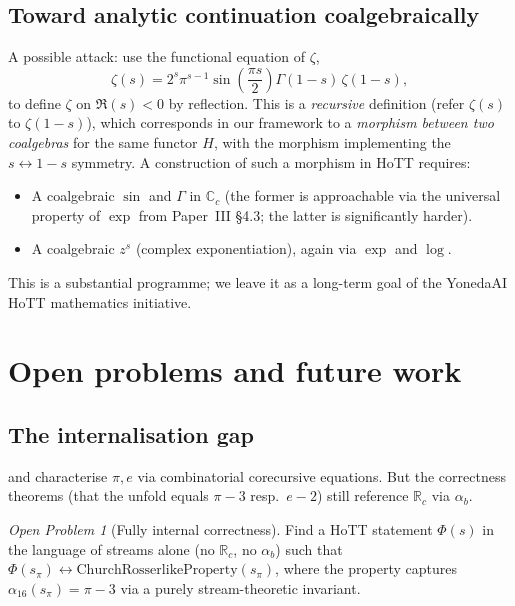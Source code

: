 \documentclass[12pt]{article}
\theoremstyle{definition}
\theoremstyle{remark}
\newtheorem{problem}[theorem]{Open Problem}
\newcommand{\R}{\mathbb{R}}
\newcommand{\Rc}{\R_c}
\begin{document}
\subsection{Toward analytic continuation coalgebraically}

A possible attack: use the functional equation of $\zeta$,
\[
\zeta(s) = 2^s \pi^{s-1} \sin\!\left(\frac{\pi s}{2}\right)
\Gamma(1-s)\,\zeta(1-s),
\]
to define $\zeta$ on $\Re(s) < 0$ by reflection. This is a
\emph{recursive} definition (refer $\zeta(s)$ to $\zeta(1-s)$),
which corresponds in our framework to a \emph{morphism between
two coalgebras} for the same functor $H$, with the morphism
implementing the $s \leftrightarrow 1-s$ symmetry. A
construction of such a morphism in HoTT requires:

\begin{itemize}
\item A coalgebraic $\sin$ and $\Gamma$ in $\mathbb{C}_c$ (the
former is approachable via the universal property of $\exp$ from
Paper~III \S 4.3; the latter is significantly harder).
\item A coalgebraic $z^s$ (complex exponentiation), again via
$\exp$ and $\log$.
\end{itemize}

This is a substantial programme; we leave it as a long-term goal
of the YonedaAI HoTT mathematics initiative.

\section{Open problems and future work}\label{sec:open}

\subsection{The internalisation gap}

 and  characterise
$\pi, e$ via combinatorial corecursive equations. But the
correctness theorems (that the unfold equals $\pi - 3$ resp.\
$e - 2$) still reference $\Rc$ via $\alpha_b$.

\begin{problem}[Fully internal correctness]\label{prob:internal}
Find a HoTT statement $\Phi(s)$ in the language of streams alone
(no $\Rc$, no $\alpha_b$) such that
$\Phi(s_\pi) \leftrightarrow \mathrm{ChurchRosserlikeProperty}(s_\pi)$,
where the property captures $\alpha_{16}(s_\pi) = \pi - 3$ via a
purely stream-theoretic invariant.
\end{problem}
\end{document}
